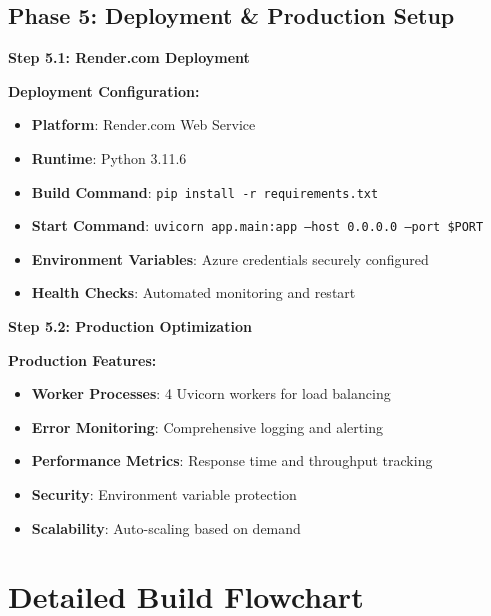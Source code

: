 \documentclass[11pt]{article}
\begin{document}
\subsection*{Phase 5: Deployment \& Production Setup}

\begin{stepbox}
\textbf{Step 5.1: Render.com Deployment}
\end{stepbox}

\begin{deploybox}
\textbf{Deployment Configuration:}
\begin{itemize}
    \item \textbf{Platform}: Render.com Web Service
    \item \textbf{Runtime}: Python 3.11.6
    \item \textbf{Build Command}: \texttt{pip install -r requirements.txt}
    \item \textbf{Start Command}: \texttt{uvicorn app.main:app --host 0.0.0.0 --port \$PORT}
    \item \textbf{Environment Variables}: Azure credentials securely configured
    \item \textbf{Health Checks}: Automated monitoring and restart
\end{itemize}
\end{deploybox}

\begin{stepbox}
\textbf{Step 5.2: Production Optimization}
\end{stepbox}

\begin{deploybox}
\textbf{Production Features:}
\begin{itemize}
    \item \textbf{Worker Processes}: 4 Uvicorn workers for load balancing
    \item \textbf{Error Monitoring}: Comprehensive logging and alerting
    \item \textbf{Performance Metrics}: Response time and throughput tracking
    \item \textbf{Security}: Environment variable protection
    \item \textbf{Scalability}: Auto-scaling based on demand
\end{itemize}
\end{deploybox}

\section*{Detailed Build Flowchart}
\end{document}
